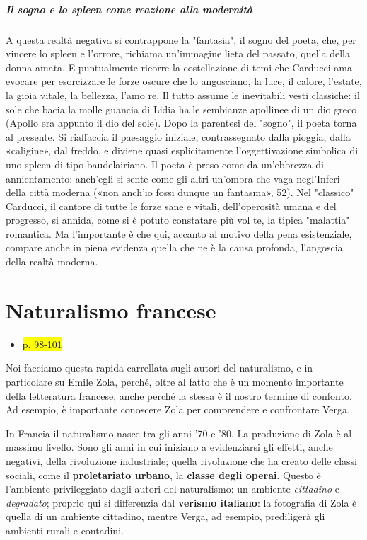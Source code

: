 \documentclass{book}
\newcommand{\pagine}[1]{\colorbox{yellow}{#1}}
\newcounter{mar}
\begin{document}
\paragraph{Il sogno e lo \textit{spleen} come reazione alla modernità} A questa realtà negativa si contrappone la "fantasia", il sogno del poeta, che, per vincere lo spleen e l'orrore, richiama un'immagine lieta del passato, quella della donna amata. E puntualmente ricorre la costellazione di temi che Carducci ama evocare per esorcizzare le forze oscure che lo angosciano, la luce, il calore, l'estate, la gioia vitale, la bellezza, l'amo re. Il tutto assume le inevitabili vesti classiche: il sole che bacia la molle guancia di Lidia ha le sembianze apollinee di un dio greco (Apollo era appunto il dio del sole). Dopo la parentesi del "sogno", il poeta torna al presente. Si riaffaccia il paesaggio iniziale, contrassegnato dalla pioggia, dalla «caligine», dal freddo, e diviene quasi esplicitamente l'oggettivazione simbolica di uno spleen di tipo baudelairiano. Il poeta è preso come da un'ebbrezza di annientamento: anch'egli si sente come gli altri un'ombra che vaga negl'Inferi della città moderna («non anch'io fossi dunque un fantasma», 52). Nel "classico" Carducci, il cantore di tutte le forze sane e vitali, dell'operosità umana e del progresso, si annida, come si è potuto constatare più vol te, la tipica "malattia" romantica. Ma l'importante è che qui, accanto al motivo della pena esistenziale, compare anche in piena evidenza quella che ne è la causa profonda, l'angoscia della realtà moderna.


\chapter{Naturalismo francese} 

\begin{itemize}
\item
  \pagine{p. 98-101}
\end{itemize}

Noi facciamo questa rapida carrellata sugli autori del naturalismo, e in
particolare su Emile Zola, perché, oltre al fatto che è un momento
importante della letteratura francese, anche perché la stessa è il
nostro termine di confonto. Ad esempio, è importante conoscere Zola per
comprendere e confrontare Verga.

In Francia il naturalismo nasce tra gli anni '70 e '80. La produzione di
Zola è al massimo livello. Sono gli anni in cui iniziano a evidenziarsi
gli effetti, anche negativi, della rivoluzione industriale; quella
rivoluzione che ha creato delle classi sociali, come il
\textbf{proletariato urbano}, la \textbf{classe degli operai}. Questo è
l'ambiente privileggiato dagli autori del naturalismo: un ambiente
\emph{cittadino} e \emph{degradato}; proprio qui si differenzia dal
\textbf{verismo italiano}: la fotografia di Zola è quella di un ambiente
cittadino, mentre Verga, ad esempio, prediligerà gli ambienti rurali e
contadini.
\end{document}
